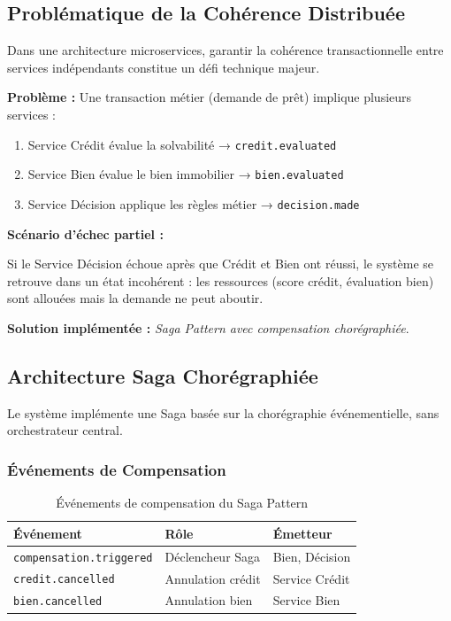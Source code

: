 \documentclass[12pt,a4paper]{article}
\begin{document}
\subsection{Problématique de la Cohérence Distribuée}

Dans une architecture microservices, garantir la cohérence transactionnelle entre services indépendants constitue un défi technique majeur.

\textbf{Problème :} Une transaction métier (demande de prêt) implique plusieurs services :

\begin{enumerate}
    \item Service Crédit évalue la solvabilité → \texttt{credit.evaluated}
    \item Service Bien évalue le bien immobilier → \texttt{bien.evaluated}
    \item Service Décision applique les règles métier → \texttt{decision.made}
\end{enumerate}

\textbf{Scénario d'échec partiel :}

Si le Service Décision échoue après que Crédit et Bien ont réussi, le système se retrouve dans un état incohérent : les ressources (score crédit, évaluation bien) sont allouées mais la demande ne peut aboutir.

\textbf{Solution implémentée :} \textit{Saga Pattern avec compensation chorégraphiée}.

\subsection{Architecture Saga Chorégraphiée}

Le système implémente une Saga basée sur la chorégraphie événementielle, sans orchestrateur central.

\subsubsection{Événements de Compensation}

\begin{table}[H]
\centering
\begin{tabular}{lll}
\toprule
\textbf{Événement} & \textbf{Rôle} & \textbf{Émetteur} \\
\midrule
\texttt{compensation.triggered} & Déclencheur Saga & Bien, Décision \\
\texttt{credit.cancelled} & Annulation crédit & Service Crédit \\
\texttt{bien.cancelled} & Annulation bien & Service Bien \\
\bottomrule
\end{tabular}
\caption{Événements de compensation du Saga Pattern}
\end{table}
\end{document}
